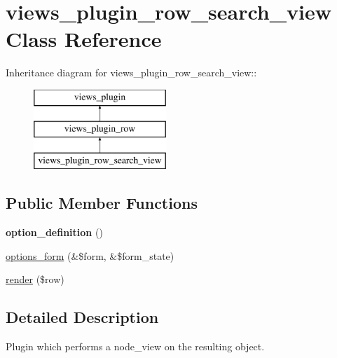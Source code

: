 \hypertarget{classviews__plugin__row__search__view}{
\section{views\_\-plugin\_\-row\_\-search\_\-view Class Reference}
\label{classviews__plugin__row__search__view}
}
Inheritance diagram for views\_\-plugin\_\-row\_\-search\_\-view::\begin{figure}[H]
\begin{center}
\leavevmode
\includegraphics[height=3cm]{classviews__plugin__row__search__view}
\end{center}
\end{figure}
\subsection*{Public Member Functions}
\begin{DoxyCompactItemize}
\item 
\hypertarget{classviews__plugin__row__search__view_ac0117a0bbff00e4833a081abb564dbf0}{
{\bfseries option\_\-definition} ()}
\label{classviews__plugin__row__search__view_ac0117a0bbff00e4833a081abb564dbf0}

\item 
\hyperlink{classviews__plugin__row__search__view_a2d2e479f414c487aff3d88343274b49b}{options\_\-form} (\&\$form, \&\$form\_\-state)
\item 
\hyperlink{classviews__plugin__row__search__view_aec0c01f2e90075589b38f73381aa4ce7}{render} (\$row)
\end{DoxyCompactItemize}


\subsection{Detailed Description}
Plugin which performs a node\_\-view on the resulting object. 


